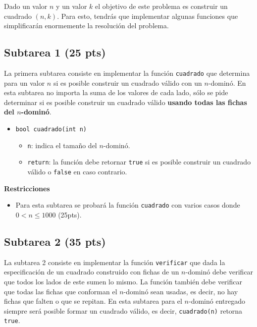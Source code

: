 \documentclass{oci}
\begin{document}
Dado un valor $n$ y un valor $k$ el objetivo de este problema es construir un cuadrado $(n,k)$.
Para esto, tendrás que implementar algunas funciones que simplificarán enormemente la resolución del problema.



\subsection*{Subtarea 1 (25 pts)}
La primera subtarea consiste en implementar la función \verb+cuadrado+ que determina para un valor $n$ si es posible construir un cuadrado válido con un $n$-dominó.
En esta subtarea no importa la suma de los valores de cada lado, sólo se pide determinar si es posible construir un cuadrado válido {\bf usando todas las fichas del $n$-dominó}.

\begin{itemize}
 \item \verb+bool cuadrado(int n)+
 \begin{itemize}
  \item \verb+n+: indica el tamaño del $n$-dominó.
  \item \verb+return+: la función debe retornar \verb+true+ si es posible construir un cuadrado válido o \verb+false+ en caso contrario.
 \end{itemize}
\end{itemize}

{\bf Restricciones}
\begin{itemize}
\item Para esta subtarea se probará la función \verb+cuadrado+ con varios casos donde $0< n\leq 1000$ (25pts).
\end{itemize}

\subsection*{Subtarea 2 (35 pts)}
La subtarea 2 consiste en implementar la función \verb+verificar+ que dada la especificación de un cuadrado construido con fichas de un $n$-dominó debe verificar que todos los lados de este sumen lo mismo.
La función también debe verificar que todas las fichas que conforman el $n$-dominó sean usadas, es decir, no hay fichas que falten o que se repitan.
En esta subtarea para el $n$-dominó entregado siempre será posible formar un cuadrado válido, es decir, \verb+cuadrado(n)+ retorna \verb+true+.
\end{document}
